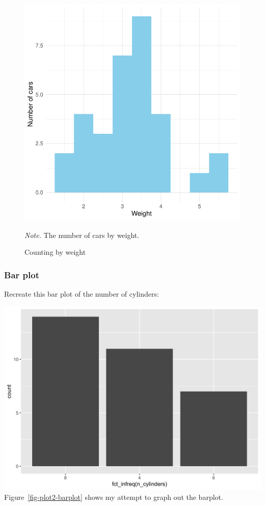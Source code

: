 \documentclass[
  man,
  floatsintext,
  longtable,
  nolmodern,
  notxfonts,
  notimes,
  colorlinks=true,linkcolor=blue,citecolor=blue,urlcolor=blue]{apa7}
\begin{document}
\begin{figure}[H]

{\caption{{Counting by weight}{\label{fig-plot1-histogram}}}}

\includegraphics{data-visualization_files/figure-pdf/fig-plot1-histogram-1.pdf}

{\noindent \emph{Note.} The number of cars by weight.}

\end{figure}

\subsubsection{Bar plot}\label{bar-plot}

Recreate this bar plot of the number of cylinders:

\includegraphics{plots/plot2.png} Figure~\ref{fig-plot2-barplot} shows
my attempt to graph out the barplot.
\end{document}
